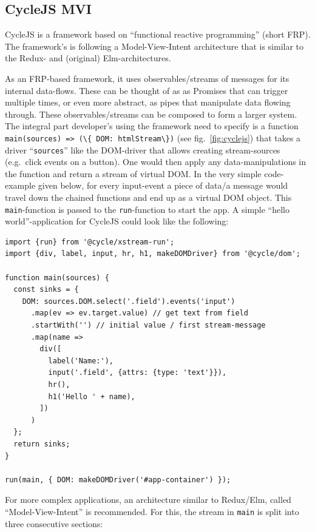 \documentclass[a4paper,,tablecaptionabove]{scrbook}
\newcommand{\passthrough}[1]{#1}
\begin{document}
\hypertarget{cyclejs-mvi}{%
\subsection{CycleJS MVI}\label{cyclejs-mvi}}

CycleJS is a framework based on \enquote{functional reactive
programming} (short FRP). The framework's is following a
Model-View-Intent architecture that is similar to the Redux- and
(original) Elm-architectures.

As an FRP-based framework, it uses observables/streams of messages for
its internal data-flows. These can be thought of as as Promises that can
trigger multiple times, or even more abstract, as pipes that manipulate
data flowing through. These observables/streams can be composed to form
a larger system. The integral part developer's using the framework need
to specify is a function
\passthrough{\lstinline!main(sources) => (\{ DOM: htmlStream\})!} (see
fig.~\ref{fig:cyclejs}) that takes a driver
\enquote{\passthrough{\lstinline!sources!}} like the DOM-driver that
allows creating stream-sources (e.g.~click events on a button). One
would then apply any data-manipulations in the function and return a
stream of virtual DOM. In the very simple code-example given below, for
every input-event a piece of data/a message would travel down the
chained functions and end up as a virtual DOM object. This
\passthrough{\lstinline!main!}-function is passed to the
\passthrough{\lstinline!run!}-function to start the app. A simple
\enquote{hello world}-application for CycleJS could look like the
following:

\begin{lstlisting}[caption={Example CycleJS app}, label=fig:cyclejs]
import {run} from '@cycle/xstream-run';
import {div, label, input, hr, h1, makeDOMDriver} from '@cycle/dom';

function main(sources) {
  const sinks = {
    DOM: sources.DOM.select('.field').events('input')
      .map(ev => ev.target.value) // get text from field
      .startWith('') // initial value / first stream-message
      .map(name =>
        div([
          label('Name:'),
          input('.field', {attrs: {type: 'text'}}),
          hr(),
          h1('Hello ' + name),
        ])
      )
  };
  return sinks;
}

run(main, { DOM: makeDOMDriver('#app-container') });
\end{lstlisting}

For more complex applications, an architecture similar to Redux/Elm,
called \enquote{Model-View-Intent} is recommended. For this, the stream
in \passthrough{\lstinline!main!} is split into three consecutive
sections:
\end{document}
